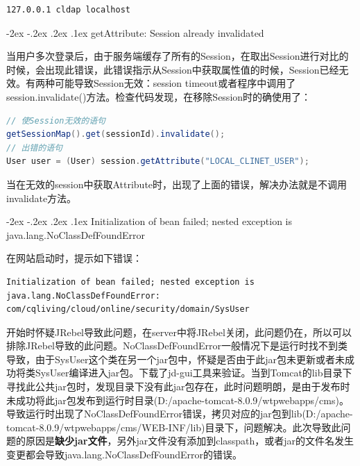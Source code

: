 \documentclass[12pt]{book}
\makeatletter
\numberwithin{dummy}{section}
\theoremstyle{ocrenumbox}
\theoremstyle{blacknumex}
\theoremstyle{blacknumbox}
\theoremstyle{ocrenum}
\renewcommand\paragraph{\@startsection{paragraph}{4}{\z@}
	{-2ex \@plus-.2ex \@minus .2ex}
	{.1ex}
	{\normalfont\small\sffamily\bfseries}}
\makeatother
\begin{document}
\begin{lstlisting}[language=Bash]
127.0.0.1 cldap localhost
\end{lstlisting}


\paragraph{getAttribute: Session already invalidated}

当用户多次登录后，由于服务端缓存了所有的Session，在取出Session进行对比的时候，会出现此错误，此错误指示从Session中获取属性值的时候，Session已经无效。有两种可能导致Session无效：session timeout或者程序中调用了session.invalidate()方法。检查代码发现，在移除Session时的确使用了：

\begin{lstlisting}[language=Java]
// 使Session无效的语句
getSessionMap().get(sessionId).invalidate();
// 出错的语句
User user = (User) session.getAttribute("LOCAL_CLINET_USER");
\end{lstlisting}

当在无效的session中获取Attribute时，出现了上面的错误，解决办法就是不调用invalidate方法。

\paragraph{Initialization of bean failed; nested exception is java.lang.NoClassDefFoundError}

在网站启动时，提示如下错误：

\begin{lstlisting}
Initialization of bean failed; nested exception is java.lang.NoClassDefFoundError: com/cqliving/cloud/online/security/domain/SysUser
\end{lstlisting}

开始时怀疑JRebel导致此问题，在server中将JRebel关闭，此问题仍在，所以可以排除JRebel导致的此问题。NoClassDefFoundError一般情况下是运行时找不到类导致，由于SysUser这个类在另一个jar包中，怀疑是否由于此jar包未更新或者未成功将类SysUser编译进入jar包。下载了jd-gui工具来验证。当到Tomcat的lib目录下寻找此公共jar包时，发现目录下没有此jar包存在，此时问题明朗，是由于发布时未成功将此jar包发布到运行时目录(D:/apache-tomcat-8.0.9/wtpwebapps/cms)。导致运行时出现了NoClassDefFoundError错误，拷贝对应的jar包到lib(D:/apache-tomcat-8.0.9/wtpwebapps/cms/WEB-INF/lib)目录下，问题解决。此次导致此问题的原因是\textbf{缺少jar文件}，另外jar文件没有添加到classpath，或者jar的文件名发生变更都会导致java.lang.NoClassDefFoundError的错误。
\end{document}

